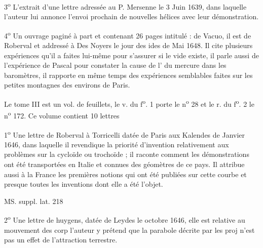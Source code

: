 \documentclass[11pt,a4paper]{article}
\begin{document}
3\textsuperscript{o} L'extrait d'une lettre adressée au P. Mersenne le 3 Juin 1639, dans laquelle l'auteur lui annonce l'envoi prochain de nouvelles hélices avec leur démonstration.

4\textsuperscript{o} Un ouvrage paginé à part et contenant 26 pages intitulé : de Vacuo, il est de Roberval et addressé à Des Noyers le jour des ides de Mai 1648. Il cite plusieurs expériences qu'il a faites lui-même pour s'assurer si le vide existe, il parle aussi de l'expérience de Pascal pour constater la cause de l' du mercure dans les baromètres, il rapporte en même temps des expériences semblables faites sur les petites montagnes des environs de Paris.

Le tome III est un vol. de  feuillets, le v. du f\textsuperscript{o}. 1 porte le n\textsuperscript{o} 28 et le r. du f\textsuperscript{o}. 2 le n\textsuperscript{o} 172. Ce volume contient 10 lettres

1\textsuperscript{o} Une lettre de Roberval à Torricelli datée de Paris aux Kalendes de Janvier 1646, dans laquelle il revendique la priorité d'invention relativement aux problèmes sur la cycloïde ou trochoïde ; il raconte comment les démonstrations ont été transportées en Italie et connues des géomètres de ce pays. Il attribue aussi à la France les premières notions qui ont été publiées sur cette courbe et presque toutes les inventions dont elle a été l'objet.


MS. suppl. lat. 218

2\textsuperscript{o} Une lettre de huygens, datée de Leydes le \ill{} octobre 1646, elle est relative au mouvement des corp l'auteur y prétend que la parabole décrite par les proj\ill{} n'est pas un effet de l'attraction terrestre.
\end{document}
